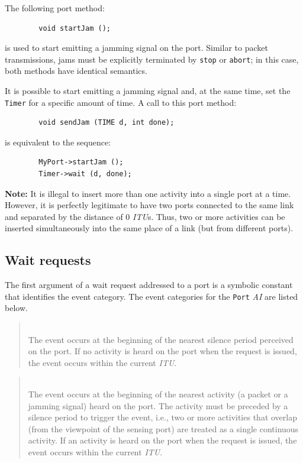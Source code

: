 The following port method:
\begin{verbatim}
        void startJam ();
\end{verbatim}
is used to start emitting a jamming signal on the port.
Similar to packet transmissions, jams must be explicitly terminated
by {\tt stop} or {\tt abort}; in this case, both methods have identical
semantics.

It is possible to start emitting a jamming signal and, at the same time,
set the {\tt Timer} for a specific amount of time.
A call to this port method:
\begin{verbatim}
        void sendJam (TIME d, int done);
\end{verbatim}
is equivalent to the sequence:
\begin{verbatim}
        MyPort->startJam ();
        Timer->wait (d, done);
\end{verbatim}

\noindent
{\bf Note:}
It is illegal to insert more than one activity into a single port at a time.
However, it is perfectly
legitimate to have two ports connected to the same link and
separated by the distance of 0 {\em ITU\/}s.
Thus, two or more activities can be inserted simultaneously into the same
place of a link (but from different ports).

\subsection{Wait requests}
\label{rm_po_wr}

The first argument of a wait request addressed to a port is a symbolic
constant that identifies the event category.
The event categories for the {\tt Port} {\em AI} are listed below.

\medskip

\begin{quote}
\noindent{}\\ \hspace{0in}
The event occurs at the beginning of the nearest silence
period perceived on the port.
If no activity is heard on the port when the request is issued,
the event occurs within the current {\em ITU}.
\end{quote}

\begin{quote}
\noindent{}\\ \hspace{0in}
The event occurs at the beginning of the nearest activity (a packet
or a jamming signal) heard on the port.
The activity must be preceded by a silence period to trigger the event, i.e.,
two or more activities that overlap (from the viewpoint of the sensing
port) are treated as a single continuous activity.
If an activity is heard on the port when the request is issued,
the event occurs within the current {\em ITU}.
\end{quote}

